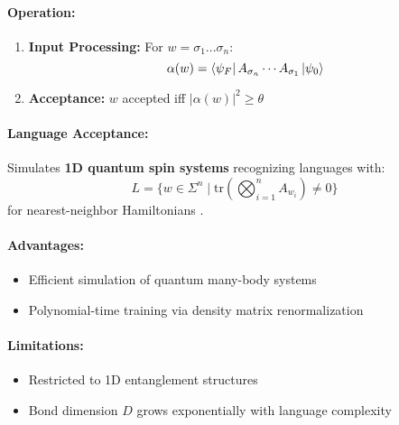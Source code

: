 \paragraph{Operation:}
\begin{enumerate}
    \item \textbf{Input Processing:} For $w = \sigma_1...\sigma_n$:
    \[
    \alpha(w) = \bra{\psi_F} A_{\sigma_n} \cdots A_{\sigma_1} \ket{\psi_0}
    \]
    \item \textbf{Acceptance:} $w$ accepted iff $|\alpha(w)|^2 \geq \theta$
\end{enumerate}

\paragraph{Language Acceptance:}
Simulates \textbf{1D quantum spin systems} recognizing languages with:
\[
L = \{w \in \Sigma^n \mid \text{tr}\left(\bigotimes_{i=1}^n A_{w_i}\right) \neq 0\}
\]
for nearest-neighbor Hamiltonians \cite{bertoni2001quantum}.

\paragraph{Advantages:}
\begin{itemize}
    \item Efficient simulation of quantum many-body systems
    \item Polynomial-time training via density matrix renormalization
\end{itemize}

\paragraph{Limitations:}
\begin{itemize}
    \item Restricted to 1D entanglement structures
    \item Bond dimension $D$ grows exponentially with language complexity
\end{itemize}

